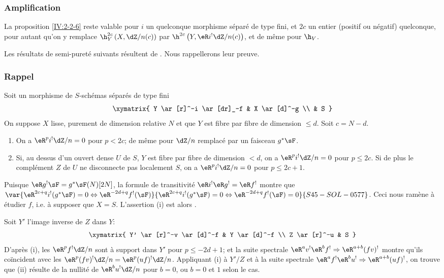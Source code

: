 \subsubsection{Amplification}\label{IV:2-2-7}

La proposition \ref{IV:2-2-6} reste valable pour $i$ un quelconque morphisme 
séparé de type fini, et $2 c$ un entier (positif ou négatif) quelconque, 
pour autant qu'on y remplace $\h_Y^{2 c}\left(X,\dZ/n(c)\right)$ par 
$\h^{2 c}\left(Y,\eR i^!\dZ/n(c)\right)$, et de même pour $\h_V$. 

Les résultats de semi-pureté suivants résultent de 
\cite[XIV 1.8, 1.10, 1.15]{sga2}. Nous rappellerons leur preuve. 





\subsubsection{Rappel}\label{IV:2-2-8}
Soit un morphisme de $S$-schémas séparés de type fini 
\[\xymatrix{
  Y \ar[r]^-i \ar[dr]_-f 
    & X \ar[d]^-g \\
  & S
}\]
On suppose $X$ lisse, purement de dimension relative $N$ et que $Y$ est fibre 
par fibre de dimension $\leqslant d$. Soit $c=N-d$. 
\begin{enumerate}[\indent (i)]
  \item On a $\eR^p i^!\dZ/n=0$ pour $p<2 c$; de même pour $\dZ/n$ remplacé 
    par un faisceau $g^* \sF$.
  \item Si, au dessus d'un ouvert dense $U$ de $S$, $Y$ est fibre par fibre de 
    dimension $<d$, on a $\eR^p i^!\dZ/n=0$ pour $p\leqslant 2 c$. Si de plus le 
    complément $Z$ de $U$ ne disconnecte pas localement $S$, on a 
    $\eR^pi^!\dZ/n=0$ pour $p\leqslant 2 c+1$.
\end{enumerate}

Puisque $\eR g^! \sF=g^*\sF(N)[2N]$, la formule de transitivité 
$\eR i^!\eR g^!=\eR f^!$ montre que 
$\var{\eR^{2 c+q} i^!(g^*\sF)=0\Leftrightarrow \eR^{-2 d+q}f^!(\sF)}{\eR^{2 c+q} i^!(g^*\sF)=0\Leftrightarrow \eR^{-2 d+q}f^!(\sF)=0}{S45-SOL-0577}$. Ceci nous 
ramène à étudier $f$, i.e. à supposer que $X=S$. L'assertion (i) est 
alors \cite[XVIII 3.17]{sga4}. 

Soit $Y'$ l'image inverse de $Z$ dans $Y$:
\[\xymatrix{
  Y' \ar[r]^-v \ar[d]^-f 
    & Y \ar[d]^-f \\
  Z \ar[r]^-u 
    & S
}\]
D'après (i), les $\eR^p f^! \dZ/n$ sont à support dans $Y'$ pour 
$p\leqslant -2 d+1$; et la suite spectrale 
$\eR^a v^!\eR^b f^! \Rightarrow \eR^{a+b} (f v)^!$ montre qu'ils coïncident avec 
les $\eR^p(f v)^!\dZ/n=\eR^p(u f)^!\dZ/n$. Appliquant (i) à $Y'/Z$ et à la 
suite spectrale $\eR^a f^!\eR^b u^! \Rightarrow \eR^{a+b} (u f)^!$, on trouve que 
(ii) résulte de la nullité de $\eR^b u^! \dZ/n$ pour $b=0$, ou $b=0$ et $1$ 
selon le cas. 





